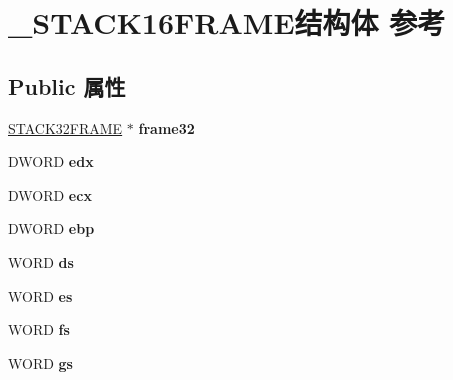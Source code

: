 \hypertarget{struct___s_t_a_c_k16_f_r_a_m_e}{}\section{\+\_\+\+S\+T\+A\+C\+K16\+F\+R\+A\+M\+E结构体 参考}
\label{struct___s_t_a_c_k16_f_r_a_m_e}
\subsection*{Public 属性}
\begin{DoxyCompactItemize}
\item 
\mbox{\label{struct___s_t_a_c_k16_f_r_a_m_e_abb807f5c224e828ee38808a37608e066}} 
\hyperlink{struct___s_t_a_c_k32_f_r_a_m_e}{S\+T\+A\+C\+K32\+F\+R\+A\+ME} $\ast$ {\bfseries frame32}
\item 
\mbox{\label{struct___s_t_a_c_k16_f_r_a_m_e_a5d3973a31389785f742478eaf1aab395}} 
D\+W\+O\+RD {\bfseries edx}
\item 
\mbox{\label{struct___s_t_a_c_k16_f_r_a_m_e_a12ec99f132a2820d3f419f2014622cad}} 
D\+W\+O\+RD {\bfseries ecx}
\item 
\mbox{\label{struct___s_t_a_c_k16_f_r_a_m_e_a282b0cb179ea293a5625597abb93586b}} 
D\+W\+O\+RD {\bfseries ebp}
\item 
\mbox{\label{struct___s_t_a_c_k16_f_r_a_m_e_ab32f9b839d3c5e8b7bac751c966b508d}} 
W\+O\+RD {\bfseries ds}
\item 
\mbox{\label{struct___s_t_a_c_k16_f_r_a_m_e_a9ba0a9454ecc8ed443c5db83b40f7e6c}} 
W\+O\+RD {\bfseries es}
\item 
\mbox{\label{struct___s_t_a_c_k16_f_r_a_m_e_aa3a95630a5eaa9b9278b8e817c943941}} 
W\+O\+RD {\bfseries fs}
\item 
\mbox{\label{struct___s_t_a_c_k16_f_r_a_m_e_a6c0d7d92913c56c938d7e4f923dea008}} 
W\+O\+RD {\bfseries gs}
\item 

\end{DoxyCompactItemize}
